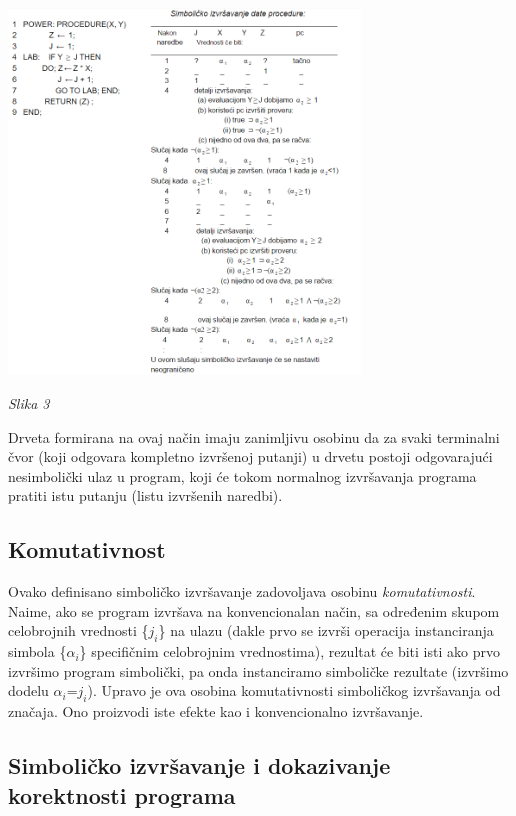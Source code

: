 \documentclass[a4paper]{article}
\begin{document}
\centerline{\includegraphics[width=0.7\textwidth]{slika2}}
\centerline{\textit{Slika 3}}

Drveta formirana na ovaj način imaju zanimljivu osobinu da 
za svaki terminalni čvor (koji odgovara kompletno izvršenoj putanji) u drvetu postoji odgovarajući nesimbolički ulaz u program, koji će tokom normalnog izvršavanja programa pratiti istu putanju (listu izvršenih naredbi).

\subsection{Komutativnost}
\label{subsec:podnaslov2}

Ovako definisano simboličko izvršavanje zadovoljava osobinu \textit{komutativnosti}. Naime, ako se program izvršava na konvencionalan način, sa određenim skupom celobrojnih vrednosti \{$j_i$\} na ulazu (dakle prvo se izvrši operacija instanciranja simbola \{$\alpha_i$\} specifičnim celobrojnim vrednostima), rezultat će biti isti ako prvo izvršimo program simbolički, pa onda instanciramo simboličke rezultate (izvršimo dodelu $\alpha_i$=$j_i$). Upravo je ova osobina komutativnosti simboličkog izvršavanja od značaja. Ono proizvodi iste efekte kao i konvencionalno izvršavanje.

\subsection{Simboličko izvršavanje i dokazivanje korektnosti programa}
\label{subsec:podnaslov3}
\end{document}
